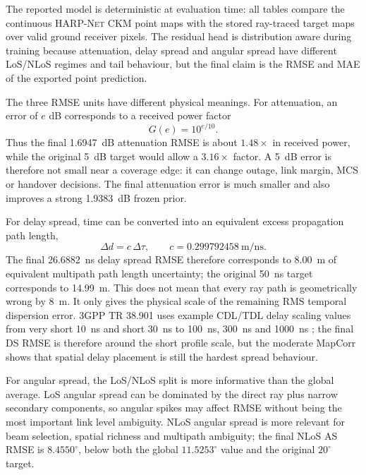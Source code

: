 \documentclass[journal]{IEEEtran}
\begin{document}
The reported model is deterministic at evaluation time: all tables compare the
continuous \textsc{HARP-Net CKM} point maps with the stored ray-traced target
maps over valid ground receiver pixels. The residual head is distribution aware
during training because attenuation, delay spread and angular spread have
different LoS/NLoS regimes and tail behaviour, but the final claim is the RMSE
and MAE of the exported point prediction.

The three RMSE units have different physical meanings. For attenuation, an
error of \(e\) dB corresponds to a received power factor
\begin{equation}
  G(e)=10^{e/10}.
\end{equation}
Thus the final \SI{1.6947}{dB} attenuation RMSE is about \(1.48\times\) in
received power, while the original \SI{5}{dB} target would allow a
\(3.16\times\) factor. A \SI{5}{dB} error is therefore not small near a
coverage edge: it can change outage, link margin, MCS or handover decisions.
The final attenuation error is much smaller and also improves a strong
\SI{1.9383}{dB} frozen prior.

For delay spread, time can be converted into an equivalent excess propagation
path length,
\begin{equation}
  \Delta d = c\,\Delta\tau,\qquad c=0.299792458~\mathrm{m/ns}.
\end{equation}
The final \SI{26.6882}{ns} delay spread RMSE therefore corresponds to
\SI{8.00}{m} of equivalent multipath path length uncertainty; the original
\SI{50}{ns} target corresponds to \SI{14.99}{m}. This does not mean that every
ray path is geometrically wrong by \SI{8}{m}. It only gives the physical scale
of the remaining RMS temporal dispersion error. 3GPP TR 38.901 uses example
CDL/TDL delay scaling values from very short \SI{10}{ns} and short
\SI{30}{ns} to \SI{100}{ns}, \SI{300}{ns} and \SI{1000}{ns}
\cite{tr38901}; the final DS RMSE is therefore around the short profile scale,
but the moderate MapCorr shows that spatial delay placement is still the
hardest spread behaviour.

For angular spread, the LoS/NLoS split is more informative than the global
average. LoS angular spread can be dominated by the direct ray plus narrow
secondary components, so angular spikes may affect RMSE without being the most
important link level ambiguity. NLoS angular spread is more relevant for
beam selection, spatial richness and multipath ambiguity; the final NLoS AS
RMSE is \(8.4550^\circ\), below both the global \(11.5253^\circ\) value and
the original \(20^\circ\) target.
\end{document}
